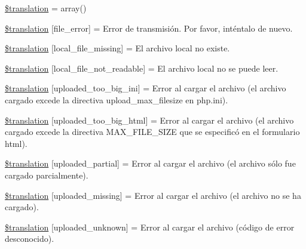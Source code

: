 \begin{DoxyCompactItemize}
\item 
\hyperlink{class_8upload_8es___e_s_8php_a1f198d410fecc3871ebdd468d343a5e3}{\$translation} = array()
\item 
\hyperlink{class_8upload_8es___e_s_8php_ac7498e49b9771b04698029aa61c70821}{\$translation} \mbox{[}\textquotesingle{}file\+\_\+error\textquotesingle{}\mbox{]} = \textquotesingle{}Error de transmisión. Por favor, inténtalo de nuevo.\textquotesingle{}
\item 
\hyperlink{class_8upload_8es___e_s_8php_a6ec3d3a47ab70d77e7aa593e82ead10e}{\$translation} \mbox{[}\textquotesingle{}local\+\_\+file\+\_\+missing\textquotesingle{}\mbox{]} = \textquotesingle{}El archivo local no existe.\textquotesingle{}
\item 
\hyperlink{class_8upload_8es___e_s_8php_a60104befef9b241f3a7a6a755618a4b3}{\$translation} \mbox{[}\textquotesingle{}local\+\_\+file\+\_\+not\+\_\+readable\textquotesingle{}\mbox{]} = \textquotesingle{}El archivo local no se puede leer.\textquotesingle{}
\item 
\hyperlink{class_8upload_8es___e_s_8php_a6a08dcd0d3651fdd098568f6b2f0a42c}{\$translation} \mbox{[}\textquotesingle{}uploaded\+\_\+too\+\_\+big\+\_\+ini\textquotesingle{}\mbox{]} = \textquotesingle{}Error al cargar el archivo (el archivo cargado excede la directiva upload\+\_\+max\+\_\+filesize en php.\+ini).\textquotesingle{}
\item 
\hyperlink{class_8upload_8es___e_s_8php_a623d5b8b92169f57d7e43458aa911cbb}{\$translation} \mbox{[}\textquotesingle{}uploaded\+\_\+too\+\_\+big\+\_\+html\textquotesingle{}\mbox{]} = \textquotesingle{}Error al cargar el archivo (el archivo cargado excede la directiva M\+A\+X\+\_\+\+F\+I\+L\+E\+\_\+\+S\+I\+Z\+E que se especificó en el formulario html).\textquotesingle{}
\item 
\hyperlink{class_8upload_8es___e_s_8php_a967c17da21b0a2d3bd65cca3a9ca0ea8}{\$translation} \mbox{[}\textquotesingle{}uploaded\+\_\+partial\textquotesingle{}\mbox{]} = \textquotesingle{}Error al cargar el archivo (el archivo sólo fue cargado parcialmente).\textquotesingle{}
\item 
\hyperlink{class_8upload_8es___e_s_8php_a0cce433260be65f1f35853a6b4b8952b}{\$translation} \mbox{[}\textquotesingle{}uploaded\+\_\+missing\textquotesingle{}\mbox{]} = \textquotesingle{}Error al cargar el archivo (el archivo no se ha cargado).\textquotesingle{}
\item 
\hyperlink{class_8upload_8es___e_s_8php_a4a9168e922b827e6a28b5db1c00774ca}{\$translation} \mbox{[}\textquotesingle{}uploaded\+\_\+unknown\textquotesingle{}\mbox{]} = \textquotesingle{}Error al cargar el archivo (código de error desconocido).\textquotesingle{}

\end{DoxyCompactItemize}
